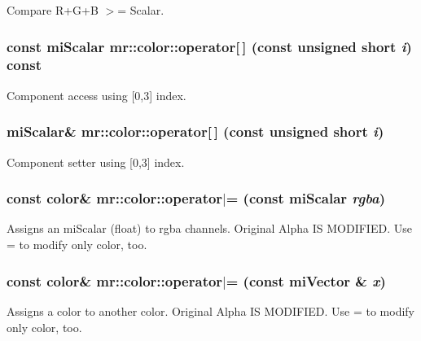 Compare R+G+B $>$= Scalar. 

\subsubsection{\setlength{\rightskip}{0pt plus 5cm}const mi\-Scalar mr::color::operator[$\,$] (const unsigned short {\em i}) const\hspace{0.3cm}{\tt  [inline]}}\label{structmr_1_1color_z9_1}


Component access using [0,3] index. 

\subsubsection{\setlength{\rightskip}{0pt plus 5cm}mi\-Scalar\& mr::color::operator[$\,$] (const unsigned short {\em i})\hspace{0.3cm}{\tt  [inline]}}\label{structmr_1_1color_z9_0}


Component setter using [0,3] index. 

\subsubsection{\setlength{\rightskip}{0pt plus 5cm}const {\bf color}\& mr::color::operator$|$= (const mi\-Scalar {\em rgba})\hspace{0.3cm}{\tt  [inline]}}\label{structmr_1_1color_z4_4}


Assigns an mi\-Scalar (float) to rgba channels. Original Alpha IS MODIFIED. Use = to modify only color, too. 
\subsubsection{\setlength{\rightskip}{0pt plus 5cm}const {\bf color}\& mr::color::operator$|$= (const mi\-Vector \& {\em x})\hspace{0.3cm}{\tt  [inline]}}\label{structmr_1_1color_z4_3}


Assigns a color to another color. Original Alpha IS MODIFIED. Use = to modify only color, too. 
